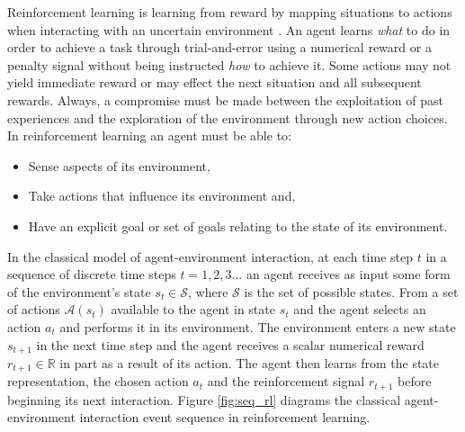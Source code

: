 Reinforcement learning is learning from reward by mapping situations to actions
when interacting with an uncertain environment \cite{suttonbarto:1998}.  An
agent learns \textit{what} to do in order to achieve a task through
trial-and-error using a numerical reward or a penalty signal without being
instructed \textit{how} to achieve it.  Some actions may not yield immediate
reward or may effect the next situation and all subsequent rewards.  Always, a
compromise must be made between the exploitation of past experiences and the
exploration of the environment through new action choices. In reinforcement
learning an agent must be able to:
\begin{itemize}
  \item Sense aspects of its environment,
  \item Take actions that influence its environment and,
  \item Have an explicit goal or set of goals relating to the state of its
  environment.
\end{itemize}

In the classical model of agent-environment interaction, at each time step $t$
in a sequence of discrete time steps $t = 1,2,3\dotsc$ an agent receives as
input some form of the environment's state $s_t \in \mathscr{S}$, where
$\mathscr{S}$ is the set of possible states.  From a set of actions
$\mathscr{A}(s_t)$ available to the agent in state $s_t$ and the agent selects
an action $a_t$ and performs it in its environment.  The environment enters a
new state $s_{t+1}$ in the next time step and the agent receives a scalar
numerical reward $r_{t+1} \in \mathbb{R}$ in part as a result of its action.
The agent then learns from the state representation, the
chosen action $a_t$ and the reinforcement signal $r_{t+1}$ before beginning
its next interaction.  Figure \ref{fig:seq_rl} diagrams the classical
agent-environment interaction event sequence in reinforcement learning.

